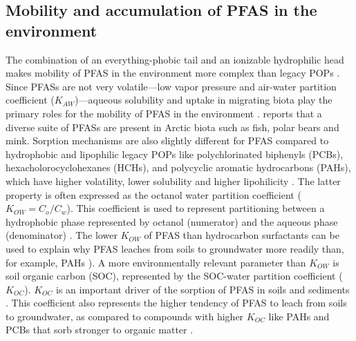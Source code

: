 \subsection{Mobility and accumulation of PFAS in the environment}
The combination of an everything-phobic tail and an ionizable hydrophilic head makes mobility of PFAS in the environment more complex than legacy POPs \citep{cabrerizo2018legacy,Arp2006}. Since PFASs are not very volatile---low vapor pressure and air-water partition coefficient ($K_{AW}$)---aqueous solubility and uptake in migrating biota play the primary roles for the mobility of PFAS in the environment \citep{Arp2006}. \cite{Schlabach2017} reports that a diverse suite of PFASs are present in Arctic biota such as fish, polar bears and mink. Sorption mechanisms are also slightly different for PFAS compared to hydrophobic and lipophilic legacy POPs like polychlorinated biphenyls (PCBs), hexacholorocyclohexanes (HCHs), and polycyclic aromatic hydrocarbons (PAHs), which have higher volatility, lower solubility and higher lipohilicity \citep{cabrerizo2018legacy,Cornelissen2005,li2018}. The latter property is often expressed as the octanol water partition coefficient (\(K_{OW} = C_{o}/C_w\)). This coefficient is used to represent partitioning between a hydrophobic phase represented by octanol (numerator) and the aqueous phase (denominator) \citep{Reemtsma2016}. The lower \(K_{OW}\) of PFAS than hydrocarbon surfactants can be used to explain why PFAS leaches from soils to groundwater more readily than, for example, PAHs \citep{Cornelissen2005,du2014adsorption}). A more environmentally relevant parameter than \(K_{OW}\) is soil organic carbon (SOC), represented by the SOC-water partition coefficient (\(K_{OC}\)). \(K_{OC}\) is an important driver of the sorption of PFAS in soils and sediments \citep{Sormo2021}. This coefficient also represents the higher tendency of PFAS to leach from soils to groundwater, as compared to compounds with higher $K_{OC}$ like PAHs and PCBs that sorb stronger to organic matter \citep{Cornelissen2005}. 

